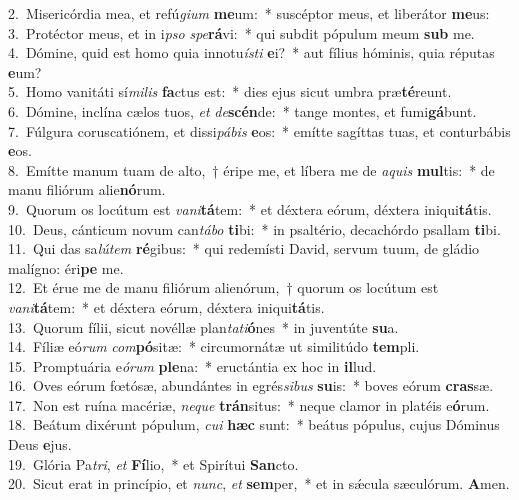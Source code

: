 {2.~}Misericórdia mea, et refú\textit{gi}\textit{um} \textbf{me}um:~* suscéptor meus, et liberátor \textbf{me}us:\\
{3.~}Protéctor meus, et in i\textit{pso} \textit{spe}\textbf{rá}vi:~* qui subdit pópulum meum \textbf{sub} me.\\
{4.~}Dómine, quid est homo quia innotu\textit{í}\textit{sti} \textbf{e}i?~* aut fílius hóminis, quia réputas \textbf{e}um?\\
{5.~}Homo vanitáti sí\textit{mi}\textit{lis} \textbf{fa}ctus est:~* dies ejus sicut umbra præ\textbf{té}reunt.\\
{6.~}Dómine, inclína cælos tuos, \textit{et} \textit{de}\textbf{scén}de:~* tange montes, et fumi\textbf{gá}bunt.\\
{7.~}Fúlgura coruscatiónem, et dissi\textit{pá}\textit{bis} \textbf{e}os:~* emítte sagíttas tuas, et conturbábis \textbf{e}os.\\
{8.~}Emítte manum tuam de alto,~† éripe me, et líbera me de \textit{a}\textit{quis} \textbf{mul}tis:~* de manu filiórum alie\textbf{nó}rum.\\
{9.~}Quorum os locútum est \textit{va}\textit{ni}\textbf{tá}tem:~* et déxtera eórum, déxtera iniqui\textbf{tá}tis.\\
{10.~}Deus, cánticum novum can\textit{tá}\textit{bo} \textbf{ti}bi:~* in psaltério, decachórdo psallam \textbf{ti}bi.\\
{11.~}Qui das sa\textit{lú}\textit{tem} \textbf{ré}gibus:~* qui redemísti David, servum tuum, de gládio malígno: éri\textbf{pe} me.\\
{12.~}Et érue me de manu filiórum alienórum,~† quorum os locútum est \textit{va}\textit{ni}\textbf{tá}tem:~* et déxtera eórum, déxtera iniqui\textbf{tá}tis.\\
{13.~}Quorum fílii, sicut novéllæ plan\textit{ta}\textit{ti}\textbf{ó}nes~* in juventúte \textbf{su}a.\\
{14.~}Fíliæ eó\textit{rum} \textit{com}\textbf{pó}sitæ:~* circumornátæ ut similitúdo \textbf{tem}pli.\\
{15.~}Promptuária e\textit{ó}\textit{rum} \textbf{ple}na:~* eructántia ex hoc in \textbf{il}lud.\\
{16.~}Oves eórum fœtósæ, abundántes in egrés\textit{si}\textit{bus} \textbf{su}is:~* boves eórum \textbf{cras}sæ.\\
{17.~}Non est ruína macériæ, \textit{ne}\textit{que} \textbf{trán}situs:~* neque clamor in platéis e\textbf{ó}rum.\\
{18.~}Beátum dixérunt pópulum, \textit{cu}\textit{i} \textbf{hæc} sunt:~* beátus pópulus, cujus Dóminus Deus \textbf{e}jus.\\
{19.~}Glória Pa\textit{tri}, \textit{et} \textbf{Fí}lio,~* et Spirítui \textbf{San}cto.\\
{20.~}Sicut erat in princípio, et \textit{nunc}, \textit{et} \textbf{sem}per,~* et in sǽcula sæculórum. \textbf{A}men.\\
